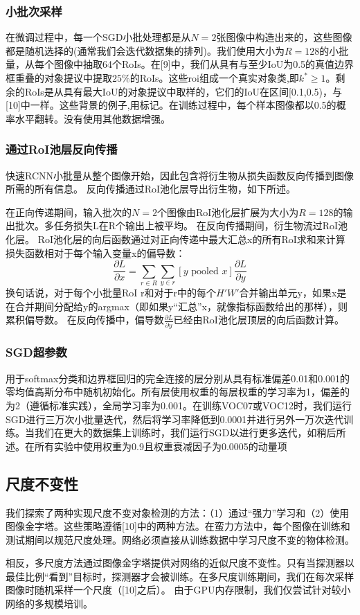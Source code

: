 \subsubsection{小批次采样}
\par 在微调过程中，每一个SGD小批处理都是从$N=2$张图像中构造出来的，这些图像都是随机选择的(通常我们会迭代数据集的排列)。我们使用大小为$R=128$的小批量，从每个图像中抽取64个RoIs。在[9]中，我们从具有与至少IoU为0.5的真值边界框重叠的对象提议中提取$25\%$的RoIs。这些roi组成一个真实对象类,即$k^* \geq 1$。剩余的RoIs是从具有最大IoU的对象提议中取样的，它们的IoU在区间[0.1,0.5)，与[10]中一样。这些背景的例子,用标记。在训练过程中，每个样本图像都以0.5的概率水平翻转。没有使用其他数据增强。
\subsubsection{通过RoI池层反向传播}
\par 快速RCNN小批量从整个图像开始，因此包含将衍生物从损失函数反向传播到图像所需的所有信息。 反向传播通过RoI池化层导出衍生物，如下所述。
\par 在正向传递期间，输入批次的$N=2$个图像由RoI池化层扩展为大小为$R=128$的输出批次。多任务损失L在R个输出上被平均。 在反向传播期间，衍生物流过RoI池化层。 RoI池化层的向后函数通过对正向传递中最大汇总x的所有RoI求和来计算损失函数相对于每个输入变量x的偏导数：
\begin{equation}
    \frac{\partial L}{\partial x}=\sum_{r\in R}\sum_{y\in r}[y\text{ pooled }x]\frac{\partial L}{\partial y}
\end{equation}
换句话说，对于每个小批量RoI r和对于r中的每个$H'W'$合并输出单元y，如果x是在合并期间分配给y的argmax（即如果y“汇总”x，就像指标函数给出的那样），则累积偏导数。 在反向传播中，偏导数$\frac{\partial L}{\partial y}$已经由RoI池化层顶层的向后函数计算。
\subsubsection{SGD超参数}
用于softmax分类和边界框回归的完全连接的层分别从具有标准偏差0.01和0.001的零均值高斯分布中随机初始化。所有层使用权重的每层权重的学习率为1，偏差的为2（遵循标准实践），全局学习率为0.001。在训练VOC07或VOC12时，我们运行SGD进行三万次小批量迭代，然后将学习率降低到0.0001并进行另外一万次迭代训练。当我们在更大的数据集上训练时，我们运行SGD以进行更多迭代，如稍后所述。在所有实验中使用权重为0.9且权重衰减因子为0.0005的动量项

\subsection{尺度不变性}
\par 我们探索了两种实现尺度不变对象检测的方法：（1）通过“强力”学习和（2）使用图像金字塔。这些策略遵循[10]中的两种方法。在蛮力方法中，每个图像在训练和测试期间以规范尺度处理。网络必须直接从训练数据中学习尺度不变的物体检测。
\par 相反，多尺度方法通过图像金字塔提供对网络的近似尺度不变性。只有当探测器以最佳比例“看到”目标时，探测器才会被训练。在多尺度训练期间，我们在每次采样图像时随机采样一个尺度（[10]之后）。 由于GPU内存限制，我们仅尝试针对较小网络的多规模培训。

